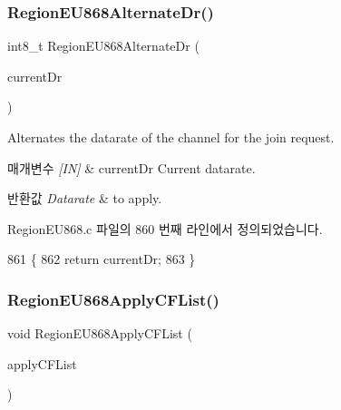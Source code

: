 \subsubsection{\texorpdfstring{Region\+E\+U868\+Alternate\+Dr()}{RegionEU868AlternateDr()}}
{\footnotesize\ttfamily int8\+\_\+t Region\+E\+U868\+Alternate\+Dr (\begin{DoxyParamCaption}\item[{int8\+\_\+t}]{current\+Dr }\end{DoxyParamCaption})}



Alternates the datarate of the channel for the join request. 


\begin{DoxyParams}{매개변수}
{\em \mbox{[}\+I\+N\mbox{]}} & current\+Dr Current datarate.\\
\hline
\end{DoxyParams}

\begin{DoxyRetVals}{반환값}
{\em Datarate} & to apply. \\
\hline
\end{DoxyRetVals}


Region\+E\+U868.\+c 파일의 860 번째 라인에서 정의되었습니다.


\begin{DoxyCode}
861 \{
862     \textcolor{keywordflow}{return} currentDr;
863 \}
\end{DoxyCode}
\mbox{\label{group___r_e_g_i_o_n_e_u868_ga87e838c747c248c577a44329c0013988}} 
\subsubsection{\texorpdfstring{Region\+E\+U868\+Apply\+C\+F\+List()}{RegionEU868ApplyCFList()}}
{\footnotesize\ttfamily void Region\+E\+U868\+Apply\+C\+F\+List (\begin{DoxyParamCaption}\item[{\mbox{\hyperlink{group___r_e_g_i_o_n_ga71588e9ad07e34b78fa91d51881fd3c6}{Apply\+C\+F\+List\+Params\+\_\+t}} $\ast$}]{apply\+C\+F\+List }\end{DoxyParamCaption})}



